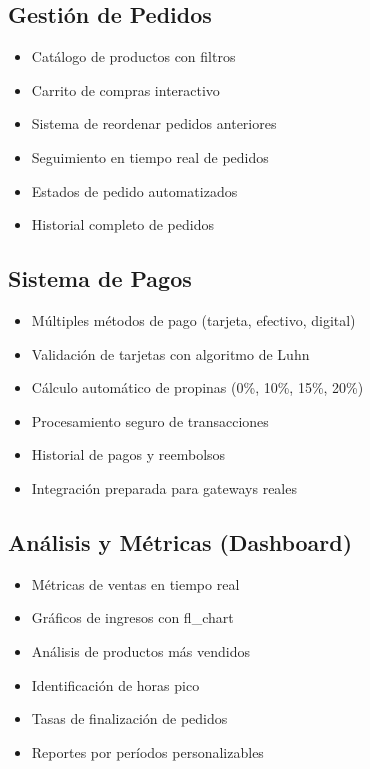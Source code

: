 \documentclass[12pt,a4paper]{article}
\begin{document}
\subsection{Gestión de Pedidos}
\begin{itemize}[itemsep=0.5em]
    \item Catálogo de productos con filtros
    \item Carrito de compras interactivo
    \item Sistema de reordenar pedidos anteriores
    \item Seguimiento en tiempo real de pedidos
    \item Estados de pedido automatizados
    \item Historial completo de pedidos
\end{itemize}

\subsection{Sistema de Pagos}
\begin{itemize}[itemsep=0.5em]
    \item Múltiples métodos de pago (tarjeta, efectivo, digital)
    \item Validación de tarjetas con algoritmo de Luhn
    \item Cálculo automático de propinas (0\%, 10\%, 15\%, 20\%)
    \item Procesamiento seguro de transacciones
    \item Historial de pagos y reembolsos
    \item Integración preparada para gateways reales
\end{itemize}

\subsection{Análisis y Métricas (Dashboard)}
\begin{itemize}[itemsep=0.5em]
    \item Métricas de ventas en tiempo real
    \item Gráficos de ingresos con fl\_chart
    \item Análisis de productos más vendidos
    \item Identificación de horas pico
    \item Tasas de finalización de pedidos
    \item Reportes por períodos personalizables
\end{itemize}
\end{document}
